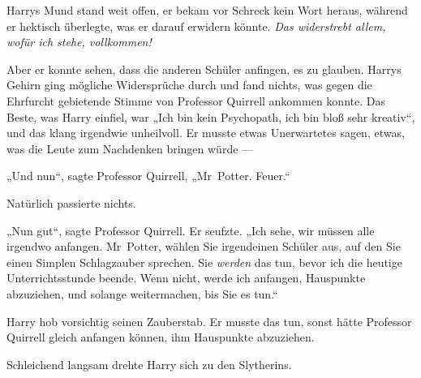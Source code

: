 Harrys Mund stand weit offen, er bekam vor Schreck kein Wort heraus, während er hektisch überlegte, was er darauf erwidern könnte. \emph{Das widerstrebt allem, wofür ich stehe, vollkommen!}

Aber er konnte sehen, dass die anderen Schüler anfingen, es zu glauben. Harrys Gehirn ging mögliche Widersprüche durch und fand nichts, was gegen die Ehrfurcht gebietende Stimme von Professor Quirrell ankommen konnte. Das Beste, was Harry einfiel, war
„Ich bin kein Psychopath, ich bin bloß sehr kreativ“, und das klang irgendwie unheilvoll. Er musste etwas Unerwartetes sagen, etwas, was die Leute zum Nachdenken bringen würde —

„Und nun“, sagte Professor Quirrell,
„Mr~Potter. Feuer.“

Natürlich passierte nichts.

„Nun gut“, sagte Professor Quirrell. Er seufzte.
„Ich sehe, wir müssen alle irgendwo anfangen. Mr~Potter, wählen Sie irgendeinen Schüler aus, auf den Sie einen Simplen Schlagzauber sprechen. Sie \emph{werden} das tun, bevor ich die heutige Unterrichtsstunde beende. Wenn nicht, werde ich anfangen, Hauspunkte abzuziehen, und solange weitermachen, bis Sie es tun.“

Harry hob vorsichtig seinen Zauberstab. Er musste das tun, sonst hätte Professor Quirrell gleich anfangen können, ihm Hauspunkte abzuziehen.

Schleichend langsam drehte Harry sich zu den Slytherins.

